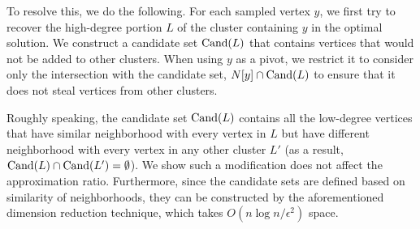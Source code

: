 To resolve this, we do the following. For each sampled vertex $y$, we first try to recover the high-degree portion $L$ of the cluster containing $y$ in the optimal solution. We construct a candidate set $\mathrm{Cand}(L)$ that contains vertices that would not be added to other clusters. When using $y$ as a pivot, we restrict it to consider only the intersection with the candidate set, $N[y] \cap \mathrm{Cand}(L)$ to ensure that it does not steal vertices from other clusters. 

Roughly speaking, the candidate set $\mathrm{Cand}(L)$ contains all the low-degree vertices that have similar neighborhood with every vertex in $L$ but have different neighborhood with every vertex in any other cluster $L'$ (as a result, $\mathrm{Cand}(L) \cap \mathrm{Cand}(L')=\emptyset$). We show such a modification does not affect the approximation ratio. Furthermore, since the candidate sets are defined based on similarity of neighborhoods, they can be constructed by the aforementioned dimension reduction technique, which takes $O(n \log n /\epsilon^2)$ space. 






